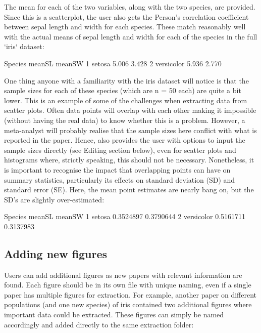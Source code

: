 \documentclass[article]{jss}
\begin{document}
The mean for each of the two variables, along with the two species, are provided. Since this is a scatterplot, the user also gets the Person's correlation coefficient between sepal length and width for each species. These match reasonably well with the actual means of sepal length and width for each of the species in the full `iris` dataset:

\begin{CodeChunk}
\begin{CodeOutput}
     Species meanSL meanSW
1     setosa  5.006  3.428
2 versicolor  5.936  2.770
\end{CodeOutput}
\end{CodeChunk}

One thing anyone with a familiarity with the iris dataset will notice is that the sample sizes for each of these species (which are n = 50 each) are quite a bit lower. This is an example of some of the challenges when extracting data from scatter plots. Often data points will overlap with each other making it impossible (without having the real data) to know whether this is a problem. However, a meta-analyst will probably realise that the sample sizes here conflict with what is reported in the paper. Hence,  also provides the user with  options to input the sample sizes directly (see Editing section below), even for scatter plots and histograms where, strictly speaking, this should not be necessary. Nonetheless, it is important to recognise the impact that overlapping points can have on summary statistics, particularly its effects on standard deviation (SD) and standard error (SE). Here, the mean point estimates are nearly bang on, but the SD's are slightly over-estimated:

\begin{CodeChunk}
\begin{CodeOutput}
     Species    meanSL    meanSW
1     setosa 0.3524897 0.3790644
2 versicolor 0.5161711 0.3137983
\end{CodeOutput}
\end{CodeChunk}



\subsection{Adding new figures}

Users can add additional figures as new papers with relevant information are found. Each figure should be in its own file with unique naming, even if a single paper has multiple figures for extraction. For example, another paper on different populations (and one new species) of iris contained two additional figures where important data could be extracted. These figures can simply be named accordingly and added directly to the same extraction folder: 
\end{document}
